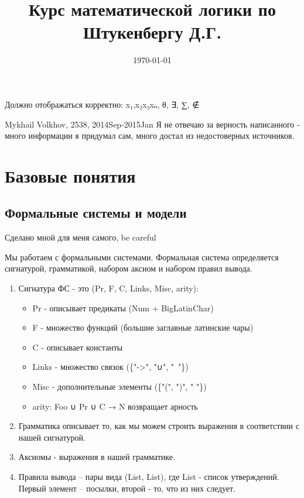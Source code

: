 \documentclass[11pt]{article}
\date{\today}
\title{Курс математической логики по Штукенбергу Д.Г.}
\begin{document}
\maketitle
\tableofcontents

Должно отображаться корректно: x₁,x₂x₃xₙ, θ, ∃, ∑, ∉

Mykhail Volkhov, 2538, 2014Sep-2015Jan
Я не отвечаю за верность написанного - много информации
я придумал сам, много достал из недостоверных источников.

\section{Базовые понятия}
\label{sec-1}
\subsection{Формальные системы и модели}
\label{sec-1-1}
Сделано мной для меня самого, be careful

Мы работаем с формальными системами.
Формальная система определяется сигнатурой, грамматикой,
набором аксиом и набором правил вывода.
\begin{enumerate}
\item Сигнатура ФС - это (Pr, F, C, Links, Misc, arity):
\begin{itemize}
\item Pr - описывает предикаты (Num + BigLatinChar)
\item F - множество функций (большие заглавные латинские чары)
\item C - описывает константы
\item Links - множество связок (\{"->", "∪", " "\})
\item Misc - дополнительные элементы (\{"(", ")", " "\})
\item arity: Foo ∪ Pr ∪ C → N возвращает арность
\end{itemize}
\item Грамматика описывает то, как мы можем строить выражения
в соответствии с нашей сигнатурой.
\item Аксиомы - выражения в нашей грамматике.
\item Правила вывода – пары вида (List, List), где List -
список утверждений. Первый элемент – посылки, второй -
то, что из них следует.
\end{enumerate}
\end{document}
